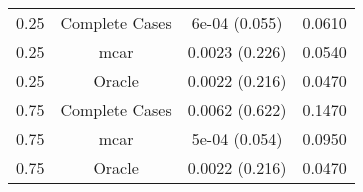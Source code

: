\begin{table}[ht]
\centering
\begin{tabular}{cccc}
  \hline
  \hline
0.25 & Complete Cases & 6e-04 (0.055) & 0.0610 \\ 
  0.25 & mcar & 0.0023 (0.226) & 0.0540 \\ 
  0.25 & Oracle & 0.0022 (0.216) & 0.0470 \\ 
  0.75 & Complete Cases & 0.0062 (0.622) & 0.1470 \\ 
  0.75 & mcar & 5e-04 (0.054) & 0.0950 \\ 
  0.75 & Oracle & 0.0022 (0.216) & 0.0470 \\ 
   \hline
\end{tabular}
\end{table}
